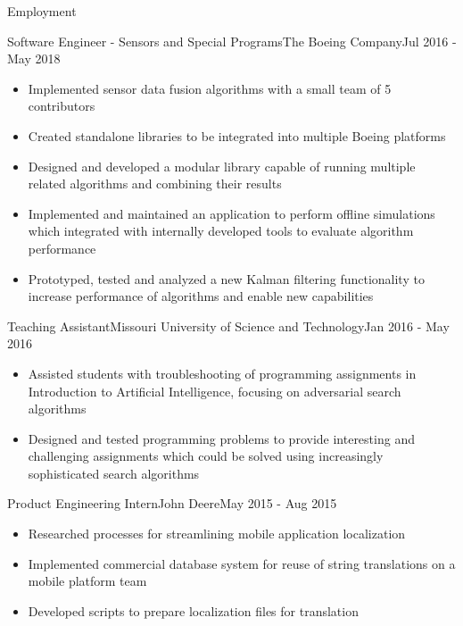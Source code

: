 \documentclass[]{mcdowellcv}
\begin{document}
\begin{cvsection}{Employment}
\begin{boeing}
    \begin{cvsubsection}{Software Engineer - Sensors and Special Programs}{The Boeing Company}{Jul 2016 - May 2018}
        \begin{itemize}
            \item Implemented sensor data fusion algorithms with a small team of 5 contributors 
            \item Created standalone libraries to be integrated into multiple Boeing platforms
            \item Designed and developed a modular library capable of running multiple related algorithms and combining their results
            \item Implemented and maintained an application to perform offline simulations which integrated with internally developed tools to evaluate algorithm performance
            \item Prototyped, tested and analyzed a new Kalman filtering functionality to increase performance of algorithms and enable new capabilities
        \end{itemize}
    \end{cvsubsection}
\end{boeing}
    
\begin{aigrader}
    \begin{cvsubsection}[2]{Teaching Assistant}{Missouri University of Science and Technology}{Jan 2016 - May 2016}
        \begin{itemize}
            \item Assisted students with troubleshooting of programming assignments in Introduction to Artificial Intelligence, focusing on adversarial search algorithms
            \item Designed and tested programming problems to provide interesting and challenging assignments which could be solved using increasingly sophisticated search algorithms
        \end{itemize}
    \end{cvsubsection}
\end{aigrader}

\begin{johndeere}
    \begin{cvsubsection}{Product Engineering Intern}{John Deere}{May 2015 - Aug 2015}
        \begin{itemize}
            \item Researched processes for streamlining mobile application localization
            \item Implemented commercial database system for reuse of string translations on a mobile platform team
            \item Developed scripts to prepare localization files for translation
        \end{itemize}
    \end{cvsubsection}
\end{johndeere}
    

\end{cvsection}
\end{document}
